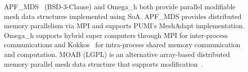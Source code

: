APF\_MDS~\cite{ibanez2016pumi} (BSD-3-Clause) and
Omega\_h both provide parallel
modifiable mesh data structures implemented using SoA.
APF\_MDS provides distributed memory parallelism via MPI and
supports PUMI's MeshAdapt implementation.
Omega\_h supports hybrid super computers through MPI for
inter-process communications and Kokkos~\cite{edwards2013kokkos} for
intra-process shared memory communication and computation.
MOAB (LGPL) is an alternative array-based distributed memory parallel
mesh data structure that supports
modification~\cite{tautges2004moab}.


